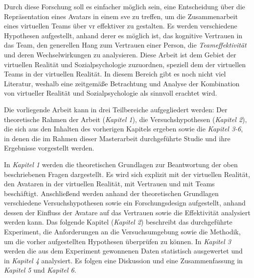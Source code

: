 \documentclass[a4paper,11pt]{article}%
\renewcommand{\\}{\vspace*{0.5\baselineskip} \newline}
\begin{document}
Durch diese Forschung soll es einfacher möglich sein, eine Entscheidung über die Repräsentation eines Avatars in einem \ac{sve} zu treffen, um die Zusammenarbeit eines virtuellen Teams über \ac{vr} effektiver zu gestalten.
Es werden verschiedene Hypothesen aufgestellt, anhand derer es möglich ist, das kognitive Vertrauen in das Team, den generellen Hang zum Vertrauen einer Person, die \textit{Teameffektivität} und deren Wechselwirkungen zu analysieren.
Diese Arbeit ist dem Gebiet der virtuellen Realität und Sozialpsychologie zuzuordnen, speziell dem der virtuellen Teams in der virtuellen Realität.
In diesem Bereich gibt es noch nicht viel Literatur, weshalb eine zeitgemäße Betrachtung und Analyse der Kombination von virtueller Realität und Sozialpsychologie als sinnvoll erachtet wird.

Die vorliegende Arbeit kann in drei Teilbereiche aufgegliedert werden: Der theoretische Rahmen der Arbeit (\textit{Kapitel 1}), die Versuchshypothesen (\textit{Kapitel 2}), die sich aus den Inhalten des vorherigen Kapitels ergeben sowie die \textit{Kapitel 3-6}, in denen die im Rahmen dieser Masterarbeit durchgeführte Studie und ihre Ergebnisse vorgestellt werden.

In \textit{Kapitel 1} werden die theoretischen Grundlagen zur Beantwortung der oben beschriebenen Fragen dargestellt. Es wird sich explizit mit der virtuellen Realität, den Avataren in der virtuellen Realität, mit Vertrauen und mit Teams beschäftigt.
Anschließend werden anhand der theoretischen Grundlagen verschiedene Versuchshypothesen sowie ein Forschungsdesign aufgestellt, anhand dessen der Einfluss der Avatare auf das Vertrauen sowie die Effektivität analysiert werden kann.
Das folgende Kapitel (\textit{Kapitel 2}) beschreibt das durchgeführte Experiment, die Anforderungen an die Versuchsumgebung sowie die Methodik, um die vorher aufgestellten Hypothesen überprüfen zu können. 
In \textit{Kapitel 3} werden die aus dem Experiment gewonnenen Daten statistisch ausgewertet und in \textit{Kapitel 4} analysiert.
Es folgen eine Diskussion und eine Zusammenfassung in \textit{Kapitel 5} und \textit{Kapitel 6}.
\end{document}

